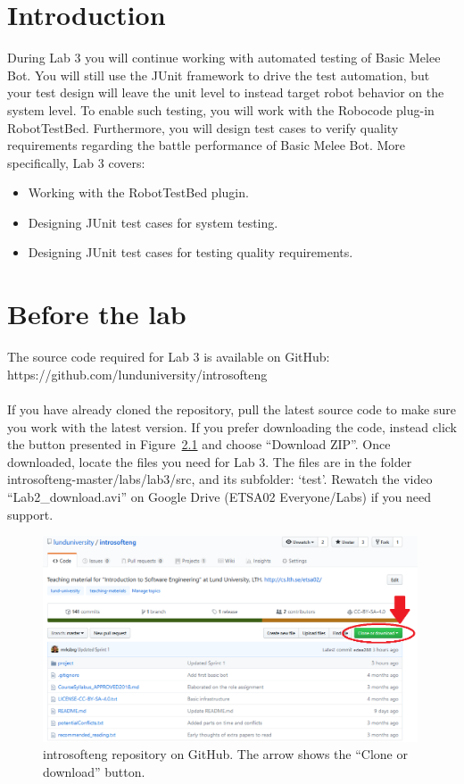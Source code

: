 \documentclass{scrreprt}
\begin{document}
\chapter{Introduction}
During Lab 3 you will continue working with automated testing of Basic Melee Bot. You will still use the JUnit framework to drive the test automation, but your test design will leave the unit level to instead target robot behavior on the system level. To enable such testing, you will work with the Robocode plug-in RobotTestBed. Furthermore, you will design test cases to verify quality requirements regarding the battle performance of Basic Melee Bot. More specifically, Lab 3 covers:

\begin{itemize}
\item Working with the RobotTestBed plugin.
\item Designing JUnit test cases for system testing.
\item Designing JUnit test cases for testing quality requirements.
\end{itemize}

\chapter{Before the lab}
The source code required for Lab 3 is available on GitHub:\\https://github.com/lunduniversity/introsofteng\\\\
If you have already cloned the repository, pull the latest source code to make sure you work with the latest version. If you prefer downloading the code, instead click the button presented in Figure~\ref{fig:github} and choose ``Download ZIP''. Once downloaded, locate the files you need for Lab 3. The files are in the folder introsofteng-master/labs/lab3/src, and its subfolder: `test'. Rewatch the video ``Lab2_download.avi'' on Google Drive (ETSA02 Everyone/Labs) if you need support.

\begin{figure}
\centering
\includegraphics[width=0.99\textwidth]{figures/GitHub.png}
\caption{introsofteng repository on GitHub. The arrow shows the ``Clone or download'' button.}
\label{fig:github}
\end{figure}
\end{document}

